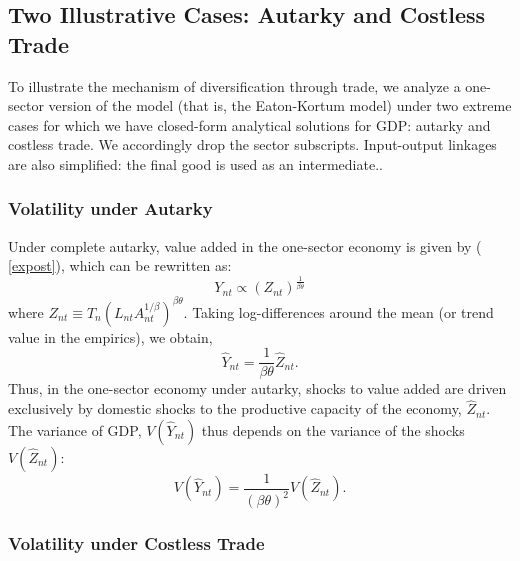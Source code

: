 \documentclass[12pt]{article}
\begin{document}
\subsection{Two Illustrative Cases: Autarky and Costless Trade}

To illustrate the mechanism of diversification through trade, we analyze a
one-sector version of the model (that is, the Eaton-Kortum model) under two
extreme cases for which we have closed-form analytical solutions for GDP:
autarky and costless trade. We accordingly drop the sector subscripts. Input-output linkages are also simplified: the final good is used as an intermediate..

\subsubsection{Volatility under Autarky}

Under complete autarky, value added in the one-sector economy is given by (%
\ref{expost}), which can be rewritten as: 
\begin{equation*}
Y_{nt}\propto \left( Z_{nt}\right) ^{\frac{1}{\beta \theta }}
\end{equation*}
where $Z_{nt}\equiv T_{n}\left( L_{nt}A_{nt}^{1/\beta }\right)^{\beta\theta
} $. Taking log-differences around the mean (or trend value in the
empirics), we obtain, 
\begin{equation*}
\hat{Y}_{nt}=\frac{1}{\beta \theta }\hat{Z}_{nt}.
\end{equation*}
Thus, in the one-sector economy under autarky, shocks to value added are
driven exclusively by domestic shocks to the productive capacity of the
economy, $\hat{Z}_{nt}.$ The variance of GDP, $V(\hat{Y}_{nt})$ thus depends
on the variance of the shocks $V(\hat{Z}_{nt})$: 
\begin{equation*}
V(\hat{Y}_{nt})=\frac{1}{\left( \beta \theta \right) ^{2}}V(\hat{Z}_{nt}).
\end{equation*}

\subsubsection{Volatility under Costless Trade}
\end{document}
